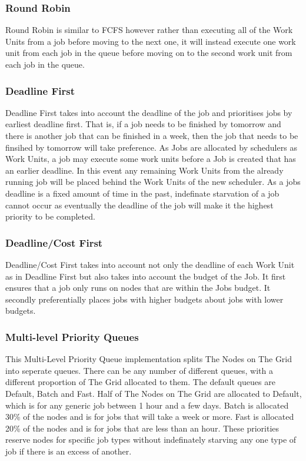 \subsubsection{Round Robin}
\label{roundrobin}

Round Robin is similar to FCFS however rather than executing all of the Work Units from a job before moving to the next one, it will instead execute one work unit from each job in the queue before moving on to the second work unit from each job in the queue. 

\subsubsection{Deadline First}
\label{deadlinefirst}

Deadline First takes into account the deadline of the job and prioritises jobs by earliest deadline first. That is, if a job needs to be finished by tomorrow and there is another job that can be finished in a week, then the job that needs to be finsihed by tomorrow will take preference. As Jobs are allocated by schedulers as Work Units, a job may execute some work units before a Job is created that has an earlier deadline. In this event any remaining Work Units from the already running job will be placed behind the Work Units of the new scheduler. As a jobs deadline is a fixed amount of time in the past, indefinate starvation of a job cannot occur as eventually the deadline of the job will make it the highest priority to be completed. 

\subsubsection{Deadline\slash Cost First}
\label{deadlinecostfirst}

Deadline\slash Cost First takes into account not only the deadline of each Work Unit as in Deadline First but also takes into account the budget of the Job. It first ensures that a job only runs on nodes that are within the Jobs budget. It secondly preferentially places jobs with higher budgets about jobs with lower budgets. 

\subsubsection{Multi-level Priority Queues}
\label{multi-levelpriorityqueues}

This Multi-Level Priority Queue implementation splits The Nodes on The Grid into seperate queues. There can be any number of different queues, with a different proportion of The Grid allocated to them. The default queues are Default, Batch and Fast. Half of The Nodes on The Grid are allocated to Default, which is for any generic job between 1 hour and a few days. Batch is allocated 30\% of the nodes and is for jobs that will take a week or more. Fast is allocated 20\% of the nodes and is for jobs that are less than an hour. These priorities reserve nodes for specific job types without indefinately starving any one type of job if there is an excess of another.

